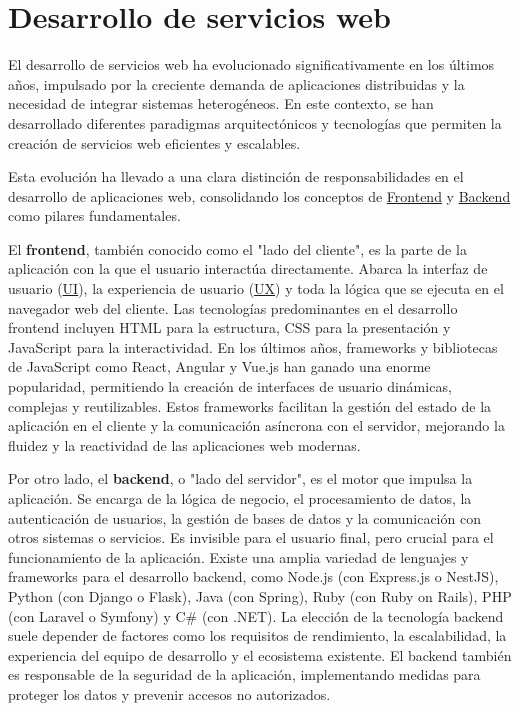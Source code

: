 \section{Desarrollo de servicios web}\label{sec:desarrollo_servicios_web}

El desarrollo de servicios web ha evolucionado significativamente en los últimos años, impulsado por la creciente demanda de aplicaciones distribuidas y la necesidad de integrar sistemas heterogéneos. En este contexto, se han desarrollado diferentes paradigmas arquitectónicos y tecnologías que permiten la creación de servicios web eficientes y escalables.

Esta evoluci\'{o}n ha llevado a una clara distinci\'{o}n de responsabilidades en el desarrollo de aplicaciones web, consolidando los conceptos de \hyperlink{frontend}{Frontend} y \hyperlink{backend}{Backend} como pilares fundamentales.

El \textbf{frontend}, tambi\'{e}n conocido como el "lado del cliente", es la parte de la aplicaci\'{o}n con la que el usuario interact\'{u}a directamente. Abarca la interfaz de usuario (\hyperlink{ui}{UI}), la experiencia de usuario (\hyperlink{ux}{UX}) y toda la l\'{o}gica que se ejecuta en el navegador web del cliente. Las tecnolog\'{i}as predominantes en el desarrollo frontend incluyen HTML para la estructura, CSS para la presentaci\'{o}n y JavaScript para la interactividad. 
\newline\newline
En los \'{u}ltimos a\~{n}os, frameworks y bibliotecas de JavaScript como React, Angular y Vue.js han ganado una enorme popularidad, permitiendo la creaci\'{o}n de interfaces de usuario din\'{a}micas, complejas y reutilizables. Estos frameworks facilitan la gesti\'{o}n del estado de la aplicaci\'{o}n en el cliente y la comunicaci\'{o}n as\'{i}ncrona con el servidor, mejorando la fluidez y la reactividad de las aplicaciones web modernas.

Por otro lado, el \textbf{backend}, o "lado del servidor", es el motor que impulsa la aplicaci\'{o}n. Se encarga de la l\'{o}gica de negocio, el procesamiento de datos, la autenticaci\'{o}n de usuarios, la gesti\'{o}n de bases de datos y la comunicaci\'{o}n con otros sistemas o servicios. Es invisible para el usuario final, pero crucial para el funcionamiento de la aplicaci\'{o}n. Existe una amplia variedad de lenguajes y frameworks para el desarrollo backend, como Node.js (con Express.js o NestJS), Python (con Django o Flask), Java (con Spring), Ruby (con Ruby on Rails), PHP (con Laravel o Symfony) y C\# (con .NET). La elecci\'{o}n de la tecnolog\'{i}a backend suele depender de factores como los requisitos de rendimiento, la escalabilidad, la experiencia del equipo de desarrollo y el ecosistema existente. El backend tambi\'{e}n es responsable de la seguridad de la aplicaci\'{o}n, implementando medidas para proteger los datos y prevenir accesos no autorizados.

